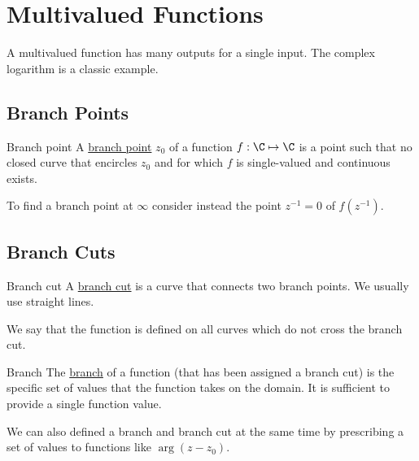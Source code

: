 \documentclass[../Main.tex]{subfiles}
\begin{document}
\section{Multivalued Functions}
A multivalued function has many outputs for a single input. The complex logarithm is a classic example.
\subsection{Branch Points}
\begin{definition}{Branch point}
    A \underline{branch point} $z_0$ of a function $f : \C \mapsto \C$ is a point such that no closed curve that encircles $z_0$ and for which $f$ is single-valued and continuous exists.
\end{definition}
To find a branch point at $\infty$ consider instead the point $z^{-1} = 0$ of $f(z^{-1})$.
\subsection{Branch Cuts}
\begin{definition}{Branch cut}
    A \underline{branch cut} is a curve that connects two branch points. We usually use straight lines.
\end{definition}
We say that the function is defined on all curves which do not cross the branch cut.
\begin{definition}{Branch}
    The \underline{branch} of a function (that has been assigned a branch cut) is the specific set of values that the function takes on the domain. It is sufficient to provide a single function value.
\end{definition}
We can also defined a branch and branch cut at the same time by prescribing a set of values to functions like $\arg(z - z_0)$.
\end{document}
